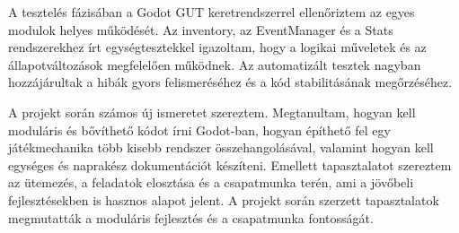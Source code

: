 \documentclass[12pt,a4paper]{article}
\begin{document}
A tesztelés fázisában a Godot GUT keretrendszerrel ellenőriztem az egyes modulok helyes működését. Az inventory, az EventManager és a Stats rendszerekhez írt egységtesztekkel igazoltam, hogy a logikai műveletek és az állapotváltozások megfelelően működnek. Az automatizált tesztek nagyban hozzájárultak a hibák gyors felismeréséhez és a kód stabilitásának megőrzéséhez.

A projekt során számos új ismeretet szereztem. Megtanultam, hogyan kell moduláris és bővíthető kódot írni Godot-ban, hogyan építhető fel egy játékmechanika több kisebb rendszer összehangolásával, valamint hogyan kell egységes és naprakész dokumentációt készíteni. Emellett tapasztalatot szereztem az ütemezés, a feladatok elosztása és a csapatmunka terén, ami a jövőbeli fejlesztésekben is hasznos alapot jelent. A projekt során szerzett tapasztalatok megmutatták a moduláris fejlesztés és a csapatmunka fontosságát.

\clearpage




\newpage


\end{document}
